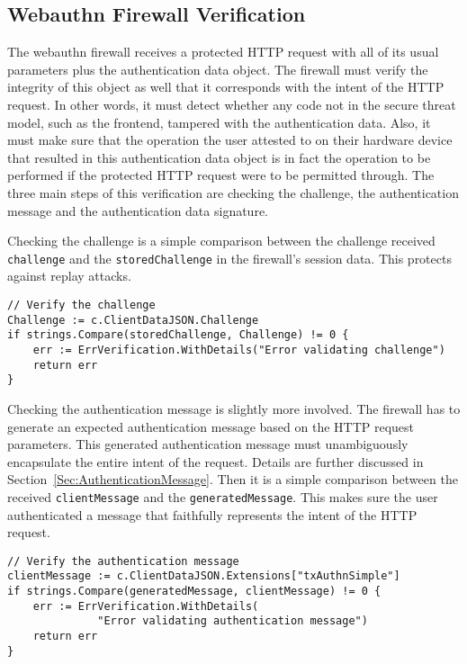 \subsection{Webauthn Firewall Verification}\label{Sec:WebauthnFirewallVerification}

The webauthn firewall receives a protected HTTP request with all of its usual parameters plus the authentication data object. The firewall must verify the integrity of this object as well that it corresponds with the intent of the HTTP request. In other words, it must detect whether any code not in the secure threat model, such as the frontend, tampered with the authentication data. Also, it must make sure that the operation the user attested to on their hardware device that resulted in this authentication data object is in fact the operation to be performed if the protected HTTP request were to be permitted through. The three main steps of this verification are checking the challenge, the authentication message and the authentication data signature.

Checking the challenge is a simple comparison between the challenge received \lstinline{challenge} and the \lstinline{storedChallenge} in the firewall's session data. This protects against replay attacks.

\begin{lstlisting}
// Verify the challenge
Challenge := c.ClientDataJSON.Challenge
if strings.Compare(storedChallenge, Challenge) != 0 {
	err := ErrVerification.WithDetails("Error validating challenge")
	return err
}
\end{lstlisting}

Checking the authentication message is slightly more involved. The firewall has to generate an expected authentication message based on the HTTP request parameters. This generated authentication message must unambiguously encapsulate the entire intent of the request. Details are further discussed in Section~\ref{Sec:AuthenticationMessage}. Then it is a simple comparison between the received \lstinline{clientMessage} and the \lstinline{generatedMessage}. This makes sure the user authenticated a message that faithfully represents the intent of the HTTP request.

\begin{lstlisting}
// Verify the authentication message
clientMessage := c.ClientDataJSON.Extensions["txAuthnSimple"]
if strings.Compare(generatedMessage, clientMessage) != 0 {
	err := ErrVerification.WithDetails(
              "Error validating authentication message")
	return err
}
\end{lstlisting}


